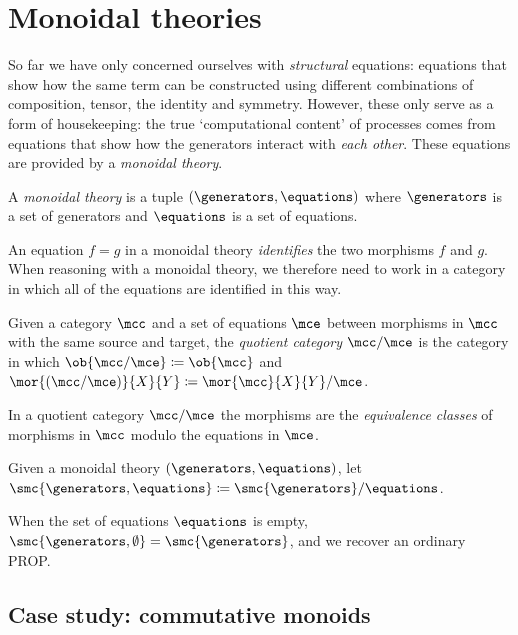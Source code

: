 \section{Monoidal theories}

So far we have only concerned ourselves with \emph{structural} equations:
equations that show how the same term can be constructed using different
combinations of composition, tensor, the identity and symmetry.
However, these only serve as a form of housekeeping: the true `computational
content' of processes comes from equations that show how the generators interact
with \emph{each other}.
These equations are provided by a \emph{monoidal theory}.

\begin{definition}
    A \emph{monoidal theory} is a tuple \((\generators, \equations)\) where
    \(\generators\) is a set of generators and \(\equations\) is a set of
    equations.
\end{definition}

An equation \(f = g\) in a monoidal theory \emph{identifies} the two morphisms
\(f\) and \(g\).
When reasoning with a monoidal theory, we therefore need to work in a category
in which all of the equations are identified in this way.

\begin{definition}
    Given a category \(\mcc\) and a set of equations \(\mce\) between
    morphisms in \(\mcc\) with the same source and target, the
    \emph{quotient category} \(\mcc / \mce\) is the category in which
    \(\ob{\mcc / \mce} \coloneqq \ob{\mcc}\) and \(
    \mor{(\mcc / \mce)}{X}{Y}
    \coloneqq
    \mor{\mcc}{X}{Y} / \mce
    \).
\end{definition}

In a quotient category \(\mcc / \mce\) the morphisms are the
\emph{equivalence classes} of morphisms in \(\mcc\) modulo the equations in
\(\mce\).

\begin{definition}
    Given a monoidal theory \((\generators, \equations)\), let
    \(\smc{\generators, \equations} \coloneqq \smc{\generators} / \equations\).
\end{definition}

When the set of equations \(\equations\) is empty,
\(\smc{\generators, \emptyset} = \smc{\generators}\), and we recover an ordinary
PROP.

\subsection{Case study: commutative monoids}

